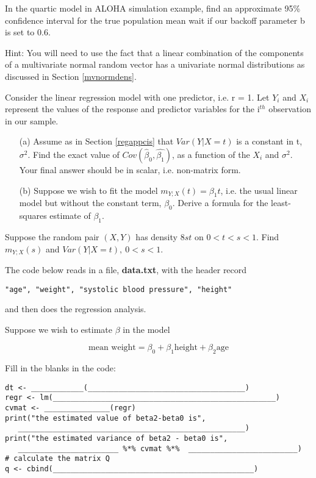 \oneproblem
In the quartic model in ALOHA simulation example, find an approximate
95\% confidence interval for the true population mean wait if our
backoff parameter b is set to 0.6.

Hint:  You will need to use the fact that a linear combination of the
components of a multivariate normal random vector has a univariate
normal distributions as discussed in Section \ref{mvnormdens}.

\oneproblem
Consider the linear regression model with one predictor, i.e. r = 1. 
Let $Y_i$ and $X_i$ represent the values of the response and 
predictor variables for the i$^{th}$ observation in our sample.  

\begin{itemize}

\item [(a)] Assume as in Section \ref{regappcis} that $Var(Y|X = t)$ is
a constant in t, $\sigma^2$.  Find the exact value of
$Cov(\hat{\beta}_0, \hat{\beta_1})$, as a function of the $X_i$ and
$\sigma^2$.  Your final answer should be in scalar, i.e. non-matrix
form.

\item [(b)] Suppose we wish to fit the model $m_{Y;X}(t) = \beta_1 t$, i.e. 
the usual linear model but without the constant term, $\beta_0$.  Derive
a formula for the least-squares estimate of $\beta_1$.

\end{itemize}

\oneproblem
Suppose the random pair $(X,Y)$ has density $8st$ on $0 < t < s < 1$.
Find $m_{Y;X}(s)$ and $Var(Y|X=t), ~ 0 < s < 1$. 

\oneproblem
The code below reads in a file, {\bf data.txt}, with the
header record

\begin{Verbatim}[fontsize=\relsize{-2}]
"age", "weight", "systolic blood pressure", "height"
\end{Verbatim}

and then does the regression analysis.

Suppose we wish to estimate $\beta$ in the model

\begin{equation*}
\textrm{mean weight} = \beta_0 + \beta_1 \textrm{height} + \beta_2
\textrm{age}
\end{equation*}

Fill in the blanks in the code:

\begin{Verbatim}[fontsize=\relsize{-2}]
dt <- ____________(____________________________________)
regr <- lm(___________________________________________________)
cvmat <- _______________(regr)
print("the estimated value of beta2-beta0 is",
   ____________________________________________________)
print("the estimated variance of beta2 - beta0 is",
   _______________________ %*% cvmat %*%  _________________________)
# calculate the matrix Q
q <- cbind(______________________________________________)
\end{Verbatim}

